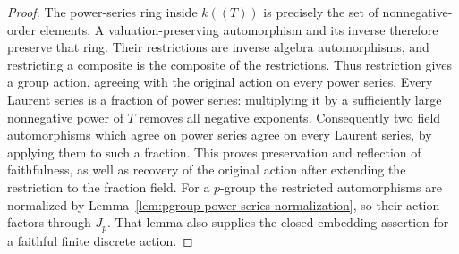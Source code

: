 \begin{proof}
The power-series ring inside $k((T))$ is precisely the set of
nonnegative-order elements. A valuation-preserving automorphism
and its inverse therefore preserve that ring. Their restrictions
are inverse algebra automorphisms, and restricting a composite
is the composite of the restrictions. Thus restriction gives a
group action, agreeing with the original action on every power
series.
Every Laurent series is a fraction of power series: multiplying
it by a sufficiently large nonnegative power of $T$ removes all
negative exponents. Consequently two field automorphisms which
agree on power series agree on every Laurent series, by applying
them to such a fraction. This proves preservation and reflection
of faithfulness, as well as recovery of the original action after
extending the restriction to the fraction field.
For a $p$-group the restricted automorphisms are normalized by
Lemma~\ref{lem:pgroup-power-series-normalization}, so their action
factors through $J_p$. That lemma also supplies the closed
embedding assertion for a faithful finite discrete action.
\end{proof}
